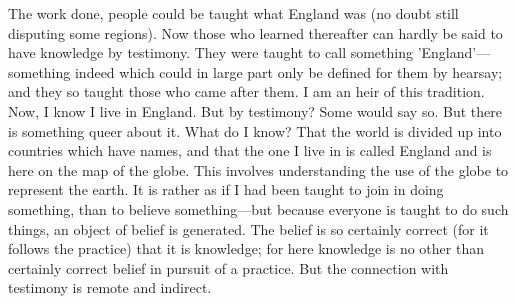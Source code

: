The work done, people could be taught what England was (no doubt still disputing
some regions). Now those who learned thereafter can hardly be said to have
knowledge by testimony. They were taught to call something 'England’—something
indeed which could in large part only be defined for them by hearsay; and they
so taught those who came after them. I am an heir of this tradition. Now, I know
I live in England. But by testimony? Some would say so. But there is something
queer about it. What do I know? That the world is divided up into countries
which have names, and that the one I live in is called England and is here on
the map of the globe. This involves understanding the use of the globe to
represent the earth. It is rather as if I had been taught to join in doing
something, than to believe something—but because everyone is taught to do such
things, an object of belief is generated. The belief is so certainly correct
(for it follows the practice) that it is knowledge; for here knowledge is no
other than certainly correct belief in pursuit of a practice. But the connection
with testimony is remote and indirect.
